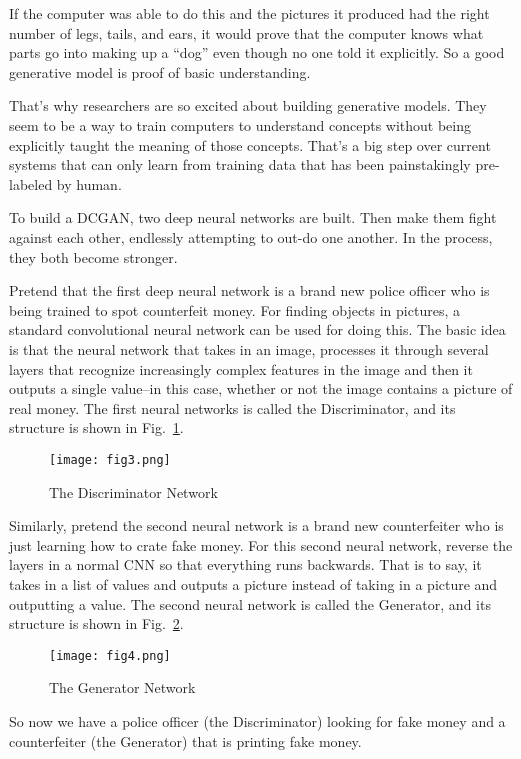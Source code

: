 \documentclass[10pt,twocolumn,letterpaper]{article}
\begin{document}
	\par
	If the computer was able to do this and the pictures it produced had the right number of legs, tails, and ears, it would prove that the computer knows what parts go into making up a ``dog'' even though no one told it explicitly. So a good generative model is proof of basic understanding.
	\par
	That's why researchers are so excited about building generative models. They seem to be a way to train computers to understand concepts without being explicitly taught the meaning of those concepts. That's a big step over current systems that can only learn from training data that has been painstakingly pre-labeled by human.
	\par
	To build a DCGAN, two deep neural networks are built. Then make them fight against each other, endlessly attempting to out-do one another. In the process, they both become stronger.
	\par
	Pretend that the first deep neural network is a brand new police officer who is being trained to spot counterfeit money. 
	For finding objects in pictures, a standard convolutional neural network can be used for doing this. The basic idea is that the neural network that takes in an image, processes it through several layers that recognize increasingly complex features in the image and then it outputs a single value--in this case, whether or not the image contains a picture of real money.
	The first neural networks is called the Discriminator, and its structure is shown in Fig.~\ref{discriminator}.
	\begin{figure}[h]
		\centering
		\texttt{[image: fig3.png]}
		\caption{The Discriminator Network} \label{discriminator}
	\end{figure}
	\par
	Similarly, pretend the second neural network is a brand new counterfeiter who is just learning how to crate fake money. For this second neural network, reverse the layers in a normal CNN so that everything runs backwards. That is to say, it takes in a list of values and outputs a picture instead of taking in a picture and outputting a value. The second neural network is called the Generator, and its structure is shown in Fig.~\ref{generator}.
	\begin{figure}[h]	
		\centering
		\texttt{[image: fig4.png]}
		\caption{The Generator Network} \label{generator}
	\end{figure}
	So now we have a police officer (the Discriminator) looking for fake money and a counterfeiter (the Generator) that is printing fake money. 
\end{document}
